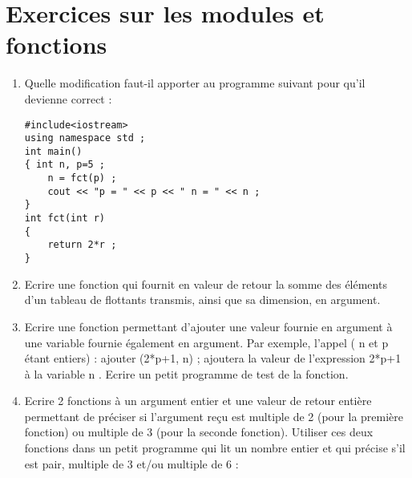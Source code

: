 \documentclass[a4paper, oneside,11pt]{book}
\begin{document}
\section{Exercices sur les modules et fonctions}

\begin{enumerate}
\item Quelle modification faut-il apporter au programme suivant pour qu'il devienne correct :
\begin{lstlisting}
#include<iostream>
using namespace std ;
int main()
{ int n, p=5 ;
    n = fct(p) ;
    cout << "p = " << p << " n = " << n ;
}
int fct(int r)
{ 
    return 2*r ;
}
\end{lstlisting}
\item Ecrire une fonction qui fournit en valeur de retour la somme des \'el\'ements d'un tableau de flottants
transmis, ainsi que sa dimension, en argument.

\item Ecrire une fonction permettant d'ajouter une valeur fournie en argument \`a une variable fournie
\'egalement en argument. Par exemple, l'appel ( n et p \'etant entiers) :
ajouter (2*p+1, n) ;
ajoutera la valeur de l'expression 2*p+1 \`a la variable n .
Ecrire un petit programme de test de la fonction.
\item Ecrire 2 fonctions \`a un argument entier et une valeur de retour enti\`ere permettant de pr\'eciser si
l'argument reçu est multiple de 2 (pour la premi\`ere fonction) ou multiple de 3 (pour la seconde fonction).
Utiliser ces deux fonctions dans un petit programme qui lit un nombre entier et qui pr\'ecise s'il est pair,
multiple de 3 et/ou multiple de 6 :






\end{enumerate}
\end{document}
